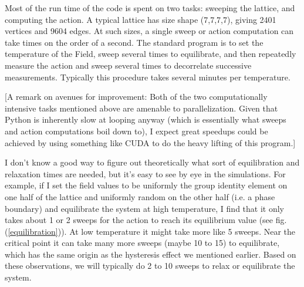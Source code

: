\documentclass[9pt,twocolumn,twoside]{article}
\begin{document}
Most of the run time of the code is spent on two tasks: sweeping the lattice, and computing the action.  A typical lattice has size shape (7,7,7,7), giving 2401 vertices and 9604 edges.  At such sizes, a single sweep or action computation can take times on the order of a second.  The standard program is to set the temperature of the Field, sweep several times to equilibrate, and then repeatedly measure the action and sweep several times to decorrelate successive measurements.  Typically this procedure takes several minutes per temperature.

[A remark on avenues for improvement: Both of the two computationally intensive tasks mentioned above are amenable to parallelization.  Given that Python is inherently slow at looping anyway (which is essentially what sweeps and action computations boil down to), I expect great speedups could be achieved by using something like CUDA to do the heavy lifting of this program.]

I don't know a good way to figure out theoretically what sort of equilibration and relaxation times are needed, but it's easy to see by eye in the simulations.  For example, if I set the field values to be uniformly the group identity element on one half of the lattice and uniformly random on the other half (i.e. a phase boundary) and equilibrate the system at high temperature, I find that it only takes about 1 or 2 sweeps for the action to reach its equilibrium value (see fig. (\ref{equilibration})).  At low temperature it might take more like 5 sweeps.  Near the critical point it can take many more sweeps (maybe 10 to 15) to equilibrate, which has the same origin as the hysteresis effect we mentioned earlier.  Based on these observations, we will typically do 2 to 10 sweeps to relax or equilibrate the system.  
\end{document}
